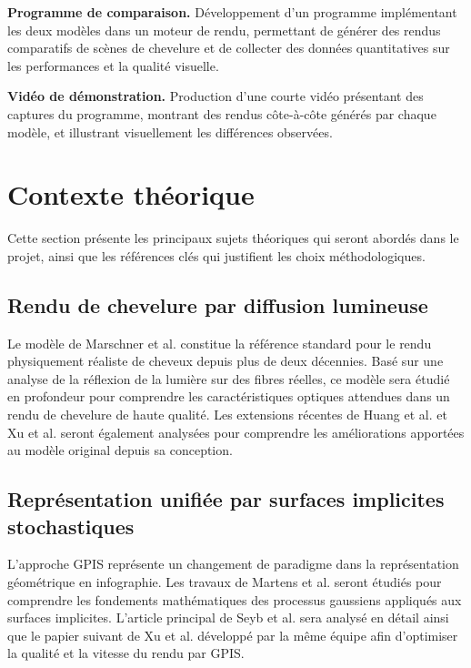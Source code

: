 \documentclass[12pt,a4paper,french]{article}
\begin{document}
\textbf{Programme de comparaison.} Développement d'un programme implémentant les deux modèles dans un moteur de rendu, permettant de générer des rendus comparatifs de scènes de chevelure et de collecter des données quantitatives sur les performances et la qualité visuelle.

\textbf{Vidéo de démonstration.} Production d'une courte vidéo présentant des captures du programme, montrant des rendus côte-à-côte générés par chaque modèle, et illustrant visuellement les différences observées.

\section{Contexte théorique}

Cette section présente les principaux sujets théoriques qui seront abordés dans le projet, ainsi que les références clés qui justifient les choix méthodologiques.

\subsection{Rendu de chevelure par diffusion lumineuse}

Le modèle de Marschner et al. \cite{marschner2003} constitue la référence standard pour le rendu physiquement réaliste de cheveux depuis plus de deux décennies. Basé sur une analyse de la réflexion de la lumière sur des fibres réelles, ce modèle sera étudié en profondeur pour comprendre les caractéristiques optiques attendues dans un rendu de chevelure de haute qualité. Les extensions récentes de Huang et al. \cite{huang2022microfacet} et Xu et al. \cite{xu2011interactive} seront également analysées pour comprendre les améliorations apportées au modèle original depuis sa conception.

\subsection{Représentation unifiée par surfaces implicites stochastiques}

L'approche GPIS représente un changement de paradigme dans la représentation géométrique en infographie. Les travaux de Martens et al. \cite{martens2016gpis} seront étudiés pour comprendre les fondements mathématiques des processus gaussiens appliqués aux surfaces implicites. L'article principal de Seyb et al. \cite{seyb24from} sera analysé en détail ainsi que le papier suivant de Xu et al. \cite{xu25practical} développé par la même équipe afin d'optimiser la qualité et la vitesse du rendu par GPIS.
\end{document}
